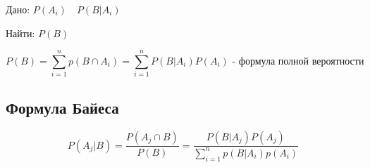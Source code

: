 \documentclass{article}
\begin{document}
	Дано: $P(A_i) \quad P(B|A_i)$
	
	Найти: $P(B)$
	
	$$
		P(B) = \sum\limits_{i = 1}^np(B \cap A_i) =
		\sum\limits_{i = 1}^nP(B|A_i)P(A_i) \textbf{ - формула полной вероятности}		
	$$
	
	\subsection{Формула Байеса}
	
	$$
		P(A_j|B) = \frac{P(A_j \cap B)}{P(B)} =
		\frac{P(B|A_j)P(A_j)}{\sum\limits_{i = 1}^n  p(B|A_i)p(A_i)}
	$$
	
\end{document}
